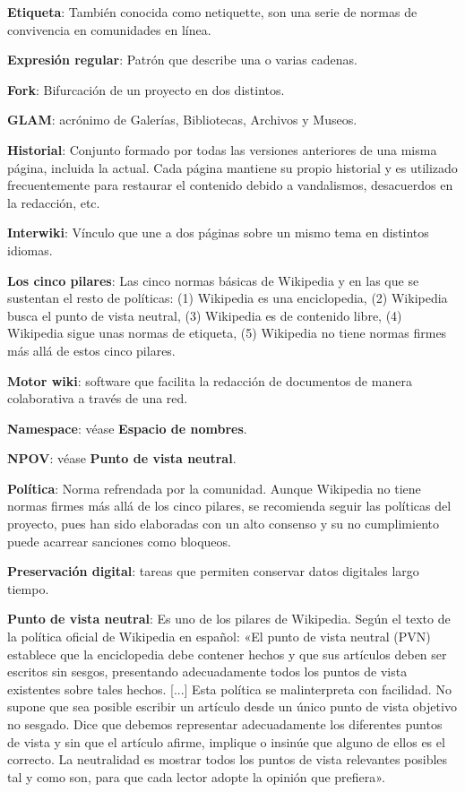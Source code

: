 \documentclass[11pt,onecolumn]{article}
\begin{document}
\textbf{Etiqueta}: También conocida como netiquette, son una serie de normas de convivencia en comunidades en línea.

\textbf{Expresión regular}: Patrón que describe una o varias cadenas.

\textbf{Fork}: Bifurcación de un proyecto en dos distintos.

\textbf{GLAM}: acrónimo de Galerías, Bibliotecas, Archivos y Museos.

\textbf{Historial}: Conjunto formado por todas las versiones anteriores de una misma página, incluida la actual. Cada página mantiene su propio historial y es utilizado frecuentemente para restaurar el contenido debido a vandalismos, desacuerdos en la redacción, etc.

\textbf{Interwiki}: Vínculo que une a dos páginas sobre un mismo tema en distintos idiomas.

\textbf{Los cinco pilares}: Las cinco normas básicas de Wikipedia y en las que se sustentan el resto de políticas: (1) Wikipedia es una enciclopedia, (2) Wikipedia busca el punto de vista neutral, (3) Wikipedia es de contenido libre, (4) Wikipedia sigue unas normas de etiqueta, (5) Wikipedia no tiene normas firmes más allá de estos cinco pilares.

\textbf{Motor wiki}: software que facilita la redacción de documentos de manera colaborativa a través de una red.

\textbf{Namespace}: véase \textbf{Espacio de nombres}.

\textbf{NPOV}: véase \textbf{Punto de vista neutral}.

\textbf{Política}: Norma refrendada por la comunidad. Aunque Wikipedia no tiene normas firmes más allá de los cinco pilares, se recomienda seguir las políticas del proyecto, pues han sido elaboradas con un alto consenso y su no cumplimiento puede acarrear sanciones como bloqueos.

\textbf{Preservación digital}: tareas que permiten conservar datos digitales largo tiempo.

\textbf{Punto de vista neutral}: Es uno de los pilares de Wikipedia. Según el texto de la política oficial de Wikipedia en español: «El punto de vista neutral (PVN) establece que la enciclopedia debe contener hechos y que sus artículos deben ser escritos sin sesgos, presentando adecuadamente todos los puntos de vista existentes sobre tales hechos. [...] Esta política se malinterpreta con facilidad. No supone que sea posible escribir un artículo desde un único punto de vista objetivo no sesgado. Dice que debemos representar adecuadamente los diferentes puntos de vista y sin que el artículo afirme, implique o insinúe que alguno de ellos es el correcto. La neutralidad es mostrar todos los puntos de vista relevantes posibles tal y como son, para que cada lector adopte la opinión que prefiera».
\end{document}
